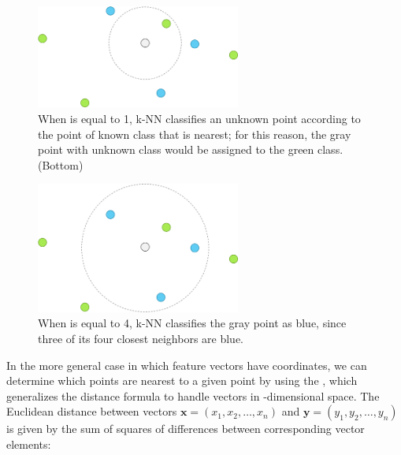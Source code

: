 \begin{figure}[h]
\centering
\mySfFamily
\includegraphics[width = 0.6\textwidth]{../images/knn_neighborhood_k=1.png}
\caption{When  is equal to 1, k-NN classifies an unknown point according to the point of known class that is nearest; for this reason, the gray point with unknown class would be assigned to the green class. (Bottom)}
\label{fig:knn_neighborhood_k=1}
\end{figure}

\begin{figure}[h]
\centering
\mySfFamily
\includegraphics[width = 0.6\textwidth]{../images/knn_neighborhood_k=4.png}
\caption{When  is equal to 4, k-NN classifies the gray point as blue, since three of its four closest neighbors are blue.}
\label{fig:knn_neighborhood_k=4}
\end{figure}

\begin{qbox}\end{qbox}

In the more general case in which feature vectors have  coordinates, we can determine which points are nearest to a given point by using the , which generalizes the distance formula to handle vectors in -dimensional space. The Euclidean distance between vectors $\mathbf{x} = (x_1, x_2, \ldots, x_n)$ and $\mathbf{y} = (y_1, y_2, \ldots, y_n)$ is given by the sum of squares of differences between corresponding vector elements:

